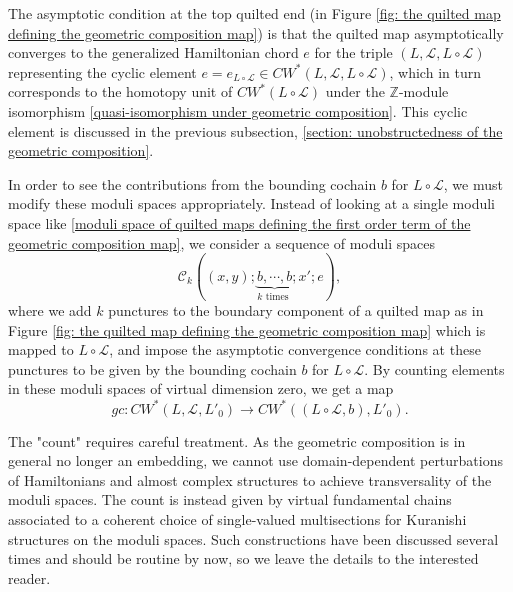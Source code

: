 \documentclass{amsart}
\numberwithin{equation}{section}
\numberwithin{figure}{section}
\begin{document}
	The asymptotic condition at the top quilted end (in Figure \ref{fig: the quilted map defining the geometric composition map}) is that the quilted map asymptotically converges to the generalized Hamiltonian chord $e$ for the triple $(L, \mathcal{L}, L \circ \mathcal{L})$ representing the cyclic element $e = e_{L \circ \mathcal{L}} \in CW^{*}(L, \mathcal{L}, L \circ \mathcal{L})$, which in turn corresponds to the homotopy unit of $CW^{*}(L \circ \mathcal{L})$ under the $\mathbb{Z}$-module isomorphism \eqref{quasi-isomorphism under geometric composition}. This cyclic element is discussed in the previous subsection, \ref{section: unobstructedness of the geometric composition}. \par
	In order to see the contributions from the bounding cochain $b$ for $L \circ \mathcal{L}$, we must modify these moduli spaces appropriately. Instead of looking at a single moduli space like \eqref{moduli space of quilted maps defining the first order term of the geometric composition map}, we consider a sequence of moduli spaces
\begin{equation}\label{moduli space of quilted maps defining the first order term of the geometric composition map with bounding cochains inserted at the boundary}
\mathcal{C}_{k}((x, y); \underbrace{b, \cdots, b}_{k \text{ times }}; x'; e),
\end{equation}
where we add $k$ punctures to the boundary component of a quilted map as in Figure \ref{fig: the quilted map defining the geometric composition map} which is mapped to $L \circ \mathcal{L}$, and impose the asymptotic convergence conditions at these punctures to be given by the bounding cochain $b$ for $L \circ \mathcal{L}$. By counting elements in these moduli spaces of virtual dimension zero, we get a map
\begin{equation}\label{quasi-isomorphism under geometric composition with deformation given by the bounding cochain}
gc: CW^{*}(L, \mathcal{L}, L'_{0}) \to CW^{*}((L \circ \mathcal{L}, b), L'_{0}).
\end{equation}

	The "count" requires careful treatment. As the geometric composition is in general no longer an embedding, we cannot use domain-dependent perturbations of Hamiltonians and almost complex structures to achieve transversality of the moduli spaces. The count is instead given by virtual fundamental chains associated to a coherent choice of single-valued multisections for Kuranishi structures on the moduli spaces. Such constructions have been discussed several times and should be routine by now, so we leave the details to the interested reader. \par
\end{document}
